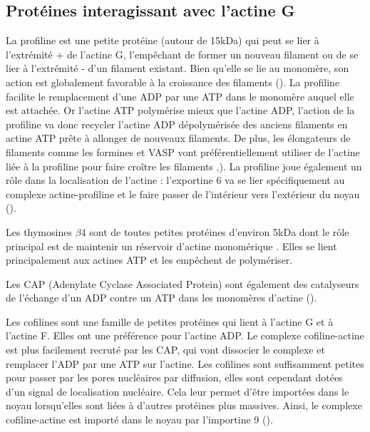 \documentclass{report}
\begin{document}
\subsection{Protéines interagissant avec l'actine G}

 La profiline est une petite protéine (autour de 15kDa) qui peut se lier à l'extrémité + de l'actine G, l'empêchant de former un nouveau filament ou de se lier à l'extrémité - d'un filament existant. 
Bien qu'elle se lie au monomère, son action est globalement favorable à la croissance des filaments (\cite{pollard_quantitative_1984}). 
La profiline facilite le remplacement d'une ADP par une ATP dans le monomère auquel elle est attachée. 
Or l'actine ATP polymérise mieux que l'actine ADP, l'action de la profiline va donc recycler l'actine ADP dépolymérisée des anciens filaments en actine ATP prête à allonger de nouveaux filaments. 
De plus, les élongateurs de filaments comme les formines et VASP vont préférentiellement utiliser de l'actine liée à la profiline pour faire croître les filaments \cite{ferron_structural_2007},\cite{romero_formin_2004}). 
La profiline joue également un rôle dans la localisation de l'actine : l'exportine 6 va se lier spécifiquement au complexe actine-profiline et le faire passer de l'intérieur vers l'extérieur du noyau (\cite{dopie_active_2012}).


Les thymosines $\beta 4$ sont de toutes petites protéines d'environ 5kDa dont le rôle principal est de maintenir un réservoir d'actine monomérique \cite{safer_isolation_1990}. Elles se lient principalement aux actines ATP et les empêchent de polymériser. 

Les CAP (Adenylate Cyclase Associated Protein) sont également des catalyseurs de l'échange d'un ADP contre un ATP dans les monomères d'actine (\cite{makkonen_mammalian_2013}). 

Les cofilines sont une famille de petites protéines qui lient à l'actine G et à l'actine F. Elles ont une préférence pour l'actine ADP. 
Le complexe cofiline-actine est plus facilement recruté par les CAP, qui vont  dissocier le complexe et remplacer l'ADP par une ATP sur l'actine. 
Les cofilines sont suffisamment petites pour passer par les pores nucléaires par diffusion, elles sont cependant dotées d'un signal de localisation nucléaire. Cela leur permet d'être importées dans le noyau lorsqu'elles sont liées à d'autres protéines plus massives. 
Ainsi, le complexe cofiline-actine est importé dans le noyau par l'importine 9 (\cite{dopie_active_2012}).
\end{document}
